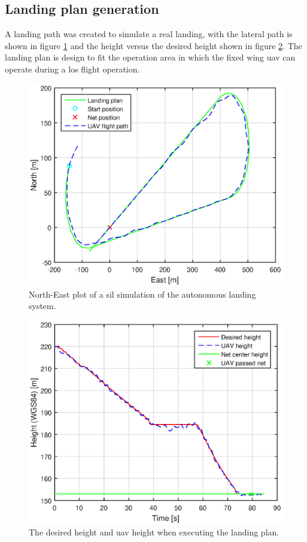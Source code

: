 \subsection{Landing plan generation}
A landing path was created to simulate a real landing, with the lateral path is shown in figure \ref{Fig:SILNorthEast090145} and the height versus the desired height  shown in figure \ref{Fig:SILHeight6juni090145}. The landing plan is design to fit the operation area in which the fixed wing \gls{uav} can operate during a \gls{los} flight operation.
\begin{figure}[H]
\centering
\includegraphics[scale=0.7]{figs/SysPlot/SILNorthEast6juni090145.eps}
\caption{North-East plot of a \gls{sil} simulation of the autonomous landing system.}
\label{Fig:SILNorthEast090145}
\end{figure}
\begin{figure}[H]
\centering
\includegraphics[scale=0.7]{figs/SysPlot/SILHeight6juni090145.eps}
\caption{The desired height and \gls{uav} height when executing the landing plan.}
\label{Fig:SILHeight6juni090145}
\end{figure}
